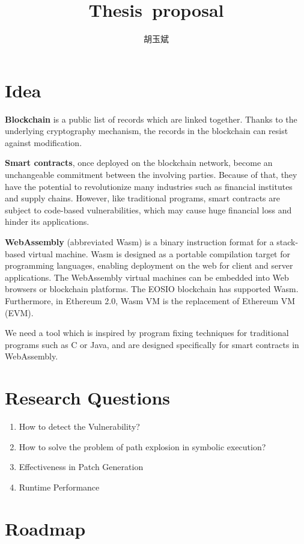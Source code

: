 \documentclass[onecolumn,oneside]{BUPTHomework}
\author{胡玉斌}
\title{Thesis\ proposal}
\begin{document}
  \maketitle
  
  \section{Idea}

  \textbf{Blockchain} is a public list of records which are linked together.
  Thanks to the underlying cryptography mechanism, the records in the blockchain can resist against modification.

  \textbf{Smart contracts}, once deployed on the blockchain network, become an unchangeable commitment between the involving parties.
  Because of that, they have the potential to revolutionize many industries such as financial institutes and supply chains.
  However, like traditional programs, smart contracts are subject to code-based vulnerabilities, which may cause huge financial loss and hinder its applications.
  
  \textbf{WebAssembly} (abbreviated Wasm) is a binary instruction format for a stack-based virtual machine.
  Wasm is designed as a portable compilation target for programming languages, enabling deployment on the web for client and server applications.
  The WebAssembly virtual machines can be embedded into Web browsers or blockchain platforms.
  The EOSIO blockchain has supported Wasm. Furthermore, in Ethereum 2.0, Wasm VM is the replacement of Ethereum VM (EVM).

  We need a tool which is inspired by program fixing techniques for traditional programs such as C or Java, and are designed specifically for smart contracts in WebAssembly.

  \section{Research Questions}

  \begin{enumerate}
    \item How to detect the Vulnerability?
    \item How to solve the problem of path explosion in symbolic execution?
    \item Effectiveness in Patch Generation
    \item Runtime Performance
  \end{enumerate}

  \section{Roadmap}
\end{document}
